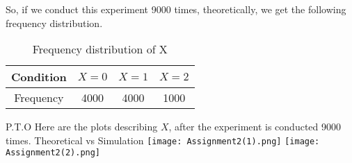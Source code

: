 \documentclass[journal,12pt,twocolumn]{IEEEtran}
\begin{document}
So, if we conduct this experiment 9000 times, theoretically, we get the following frequency distribution.

\begin{table}[h!]
\centering
\caption{Frequency distribution of X}
\label{table:2}
\begin{tabular}{|c||c|c|c|}
    \hline
    Condition & $X = 0$& $X =1 $& $X=2$ \\
    \hline
    Frequency & 4000 & 4000 & 1000\\
    \hline
\end{tabular}
\end{table}
P.T.O
\newpage
Here are the plots describing $X$, after the experiment is conducted 9000 times.
\newline
\newline
Theoretical vs Simulation
\newline
\newline
\texttt{[image: Assignment2(1).png]}
\texttt{[image: Assignment2(2).png]}
\end{document}
